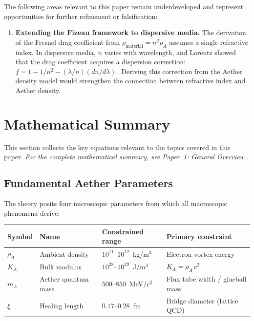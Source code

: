﻿\documentclass[12pt,letterpaper]{article}
\newcommand{\rhoa}{\rho_{\!A}}
\newcommand{\Ka}{K_{\!A}}
\begin{document}
The following areas relevant to this paper remain underdeveloped and represent opportunities for further refinement or falsification:

\begin{enumerate}[leftmargin=2em]
  \item \textbf{Extending the Fizeau framework to dispersive media.} The derivation of the Fresnel
    drag coefficient from $\rho_{\mathrm{material}} = n^2 \rhoa$ assumes a single refractive index.
    In dispersive media, $n$ varies with wavelength, and Lorentz \cite{lorentz1887} showed that the drag
    coefficient acquires a dispersion correction:
    $f = 1 - 1/n^2 - (\lambda/n)(dn/d\lambda)$.\ Deriving this correction from the Aether
    density model would strengthen the connection between refractive index and
    Aether density.

\end{enumerate}



\section{Mathematical Summary}

This section collects the key equations relevant to the topics covered in this paper.
\noindent\textit{For the complete mathematical summary, see Paper~1: General Overview \cite{otto-overview}.}

\subsection{Fundamental Aether Parameters}

The theory posits four microscopic parameters from which all macroscopic
phenomena derive:
%
\begin{center}
\begin{tabular}{@{}llll@{}}
\hline
\textbf{Symbol} & \textbf{Name} & \textbf{Constrained range} & \textbf{Primary constraint} \\
\hline
$\rhoa$  & Ambient density     & $10^{11}$--$10^{12}$~kg/m$^3$         & Electron vortex energy \\
$\Ka$    & Bulk modulus         & $10^{28}$--$10^{29}$~J/m$^3$          & $\Ka = \rhoa\,c^2$ \\
$m_A$    & Aether quantum mass  & $500$--$850$~MeV/$c^2$                & Flux tube width / glueball mass \\
$\xi$    & Healing length       & $0.17$--$0.28$~fm                     & Bridge diameter (lattice QCD) \\
\hline
\end{tabular}
\end{center}
\end{document}

